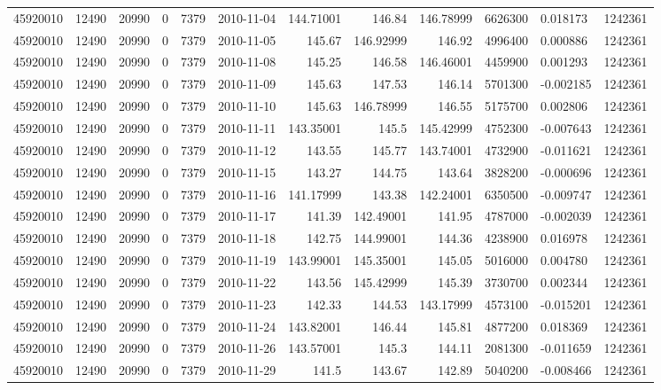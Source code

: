 \begin{tabular}{l | r | r | r | r | l | r | r | r | r | l | r}
45920010 & 12490 & 20990 & 0 & 7379 & 2010-11-04 & 144.71001 & 146.84 & 146.78999 & 6626300 & 0.018173 & 1242361 \\
45920010 & 12490 & 20990 & 0 & 7379 & 2010-11-05 & 145.67 & 146.92999 & 146.92 & 4996400 & 0.000886 & 1242361 \\
45920010 & 12490 & 20990 & 0 & 7379 & 2010-11-08 & 145.25 & 146.58 & 146.46001 & 4459900 & 0.001293 & 1242361 \\
45920010 & 12490 & 20990 & 0 & 7379 & 2010-11-09 & 145.63 & 147.53 & 146.14 & 5701300 & -0.002185 & 1242361 \\
45920010 & 12490 & 20990 & 0 & 7379 & 2010-11-10 & 145.63 & 146.78999 & 146.55 & 5175700 & 0.002806 & 1242361 \\
45920010 & 12490 & 20990 & 0 & 7379 & 2010-11-11 & 143.35001 & 145.5 & 145.42999 & 4752300 & -0.007643 & 1242361 \\
45920010 & 12490 & 20990 & 0 & 7379 & 2010-11-12 & 143.55 & 145.77 & 143.74001 & 4732900 & -0.011621 & 1242361 \\
45920010 & 12490 & 20990 & 0 & 7379 & 2010-11-15 & 143.27 & 144.75 & 143.64 & 3828200 & -0.000696 & 1242361 \\
45920010 & 12490 & 20990 & 0 & 7379 & 2010-11-16 & 141.17999 & 143.38 & 142.24001 & 6350500 & -0.009747 & 1242361 \\
45920010 & 12490 & 20990 & 0 & 7379 & 2010-11-17 & 141.39 & 142.49001 & 141.95 & 4787000 & -0.002039 & 1242361 \\
45920010 & 12490 & 20990 & 0 & 7379 & 2010-11-18 & 142.75 & 144.99001 & 144.36 & 4238900 & 0.016978 & 1242361 \\
45920010 & 12490 & 20990 & 0 & 7379 & 2010-11-19 & 143.99001 & 145.35001 & 145.05 & 5016000 & 0.004780 & 1242361 \\
45920010 & 12490 & 20990 & 0 & 7379 & 2010-11-22 & 143.56 & 145.42999 & 145.39 & 3730700 & 0.002344 & 1242361 \\
45920010 & 12490 & 20990 & 0 & 7379 & 2010-11-23 & 142.33 & 144.53 & 143.17999 & 4573100 & -0.015201 & 1242361 \\
45920010 & 12490 & 20990 & 0 & 7379 & 2010-11-24 & 143.82001 & 146.44 & 145.81 & 4877200 & 0.018369 & 1242361 \\
45920010 & 12490 & 20990 & 0 & 7379 & 2010-11-26 & 143.57001 & 145.3 & 144.11 & 2081300 & -0.011659 & 1242361 \\
45920010 & 12490 & 20990 & 0 & 7379 & 2010-11-29 & 141.5 & 143.67 & 142.89 & 5040200 & -0.008466 & 1242361 \\

\end{tabular}
